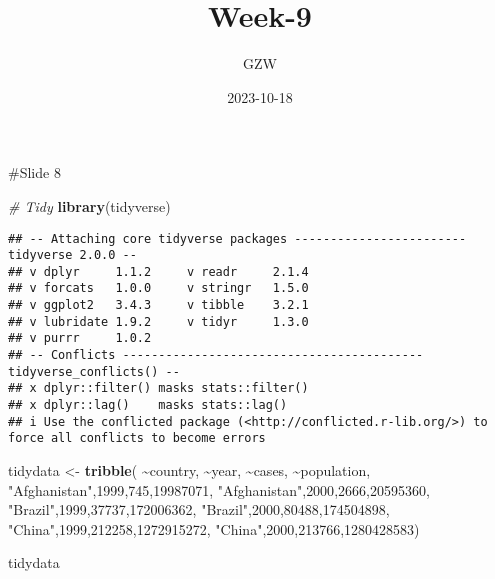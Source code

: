 \documentclass[
]{article}
\title{Week-9}
\author{GZW}
\date{2023-10-18}
\newenvironment{Shaded}{\begin{snugshade}}{\end{snugshade}}
\newcommand{\CommentTok}[1]{\textcolor[rgb]{0.56,0.35,0.01}{\textit{#1}}}
\newcommand{\DecValTok}[1]{\textcolor[rgb]{0.00,0.00,0.81}{#1}}
\newcommand{\FunctionTok}[1]{\textcolor[rgb]{0.13,0.29,0.53}{\textbf{#1}}}
\newcommand{\NormalTok}[1]{#1}
\newcommand{\OtherTok}[1]{\textcolor[rgb]{0.56,0.35,0.01}{#1}}
\newcommand{\SpecialCharTok}[1]{\textcolor[rgb]{0.81,0.36,0.00}{\textbf{#1}}}
\newcommand{\StringTok}[1]{\textcolor[rgb]{0.31,0.60,0.02}{#1}}
\begin{document}
\maketitle

\#Slide 8

\begin{Shaded}
\begin{Highlighting}[]
\CommentTok{\# Tidy}
\FunctionTok{library}\NormalTok{(tidyverse)}
\end{Highlighting}
\end{Shaded}

\begin{verbatim}
## -- Attaching core tidyverse packages ------------------------ tidyverse 2.0.0 --
## v dplyr     1.1.2     v readr     2.1.4
## v forcats   1.0.0     v stringr   1.5.0
## v ggplot2   3.4.3     v tibble    3.2.1
## v lubridate 1.9.2     v tidyr     1.3.0
## v purrr     1.0.2     
## -- Conflicts ------------------------------------------ tidyverse_conflicts() --
## x dplyr::filter() masks stats::filter()
## x dplyr::lag()    masks stats::lag()
## i Use the conflicted package (<http://conflicted.r-lib.org/>) to force all conflicts to become errors
\end{verbatim}

\begin{Shaded}
\begin{Highlighting}[]
\NormalTok{tidydata }\OtherTok{\textless{}{-}} \FunctionTok{tribble}\NormalTok{(}
\SpecialCharTok{\textasciitilde{}}\NormalTok{country, }\SpecialCharTok{\textasciitilde{}}\NormalTok{year, }\SpecialCharTok{\textasciitilde{}}\NormalTok{cases, }\SpecialCharTok{\textasciitilde{}}\NormalTok{population,}
\StringTok{"Afghanistan"}\NormalTok{,}\DecValTok{1999}\NormalTok{,}\DecValTok{745}\NormalTok{,}\DecValTok{19987071}\NormalTok{,}
\StringTok{"Afghanistan"}\NormalTok{,}\DecValTok{2000}\NormalTok{,}\DecValTok{2666}\NormalTok{,}\DecValTok{20595360}\NormalTok{,}
\StringTok{"Brazil"}\NormalTok{,}\DecValTok{1999}\NormalTok{,}\DecValTok{37737}\NormalTok{,}\DecValTok{172006362}\NormalTok{,}
\StringTok{"Brazil"}\NormalTok{,}\DecValTok{2000}\NormalTok{,}\DecValTok{80488}\NormalTok{,}\DecValTok{174504898}\NormalTok{,}
\StringTok{"China"}\NormalTok{,}\DecValTok{1999}\NormalTok{,}\DecValTok{212258}\NormalTok{,}\DecValTok{1272915272}\NormalTok{,}
\StringTok{"China"}\NormalTok{,}\DecValTok{2000}\NormalTok{,}\DecValTok{213766}\NormalTok{,}\DecValTok{1280428583}\NormalTok{)}

\NormalTok{tidydata}
\end{Highlighting}
\end{Shaded}
\end{document}
